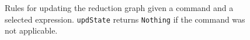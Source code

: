 \begin{figure}[t]
\caption{Rules for updating the reduction graph given a command and a selected expression. \texttt{updState} returns \texttt{Nothing} if the command was not applicable. %
}
\label{fig:traversing-graph}
\end{figure}
